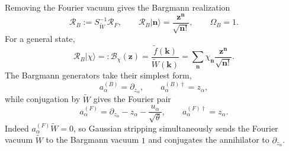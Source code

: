 \documentclass[11pt,oneside]{article}
\numberwithin{equation}{section}
\theoremstyle{definition}
\begin{document}
Removing the Fourier vacuum gives the Bargmann realization
\begin{equation}
\mathcal R_B:=S_{\widetilde W}^{-1}\mathcal R_F,
\qquad
\mathcal R_B|\bm n\rangle
=\frac{\bm z^{\bm n}}{\sqrt{\bm n!}},
\qquad
\Omega_B=1.
\label{eq:maxwell_RB_basis_vacuum}
\end{equation}
For a general state,
\begin{equation}
\mathcal R_B|\chi\rangle
=: \mathscr B_\chi(\bm z)
=
\frac{\widetilde f(\bm k)}{\widetilde W(\bm k)}
=
\sum_{\bm n}\chi_{\bm n}\frac{\bm z^{\bm n}}{\sqrt{\bm n!}}.
\label{eq:maxwell_bargmann_symbol}
\end{equation}
The Bargmann generators take their simplest form,
\begin{equation}
a^{(B)}_\alpha=\partial_{z_\alpha},
\qquad
a^{(B)\dagger}_\alpha=z_\alpha,
\label{eq:maxwell_ladder_B}
\end{equation}
while conjugation by $\widetilde W$ gives the Fourier pair
\begin{equation}
a^{(F)}_\alpha
=\partial_{z_\alpha}-z_\alpha-\frac{u_\alpha}{\sqrt\theta},
\qquad
a^{(F)\dagger}_\alpha=z_\alpha.
\label{eq:maxwell_ladder_F_ann}
\end{equation}
Indeed $a^{(F)}_\alpha\widetilde W=0$, so Gaussian stripping simultaneously sends the Fourier vacuum $\widetilde W$ to the Bargmann vacuum $1$ and conjugates the annihilator to $\partial_{z_\alpha}$.
\end{document}
